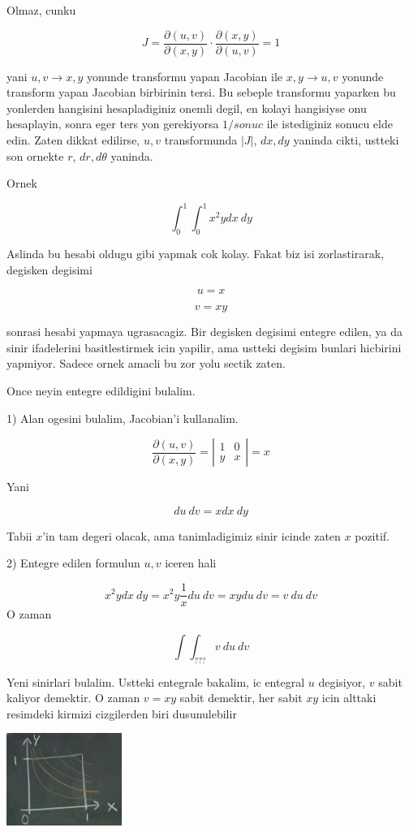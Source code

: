 \documentclass[12pt,fleqn]{article}
\begin{document}
Olmaz, cunku 

\[ J = \frac{\partial (u,v)}{\partial(x,y)} \cdot
\frac{\partial (x,y)}{\partial(u,v)} = 1
 \]

yani $u,v \to x,y$ yonunde transformu yapan Jacobian ile $x,y \to u,v$
yonunde transform yapan Jacobian birbirinin tersi. Bu sebeple transformu
yaparken bu yonlerden hangisini hesapladiginiz onemli degil, en kolayi
hangisiyse onu hesaplayin, sonra eger ters yon gerekiyorsa $1 / sonuc$ ile
istediginiz sonucu elde edin. Zaten dikkat edilirse, $u,v$ transformunda
$|J|$, $dx,dy$ yaninda cikti, ustteki son ornekte $r$, $dr,d\theta$
yaninda. 

Ornek

\[ \int_0^1 \int_0^1 x^2y dx \ dy  \]

Aslinda bu hesabi oldugu gibi yapmak cok kolay. Fakat biz isi
zorlastirarak, degisken degisimi

\[ u =x  \]

\[ v = xy \]

sonrasi hesabi yapmaya ugrasacagiz. Bir degisken degisimi entegre edilen,
ya da sinir ifadelerini basitlestirmek icin yapilir, ama ustteki degisim
bunlari hicbirini yapmiyor. Sadece ornek amacli bu zor yolu sectik zaten. 

Once neyin entegre edildigini bulalim. 

1) Alan ogesini bulalim, Jacobian'i kullanalim. 

\[ \frac{\partial (u,v)}{\partial(x,y)}  = 
\left|\begin{array}{rr}
1 & 0 \\
y & x
\end{array}\right| = 
x
 \]

Yani

\[ du \ dv = x dx \ dy \]

Tabii $x$'in tam degeri olacak, ama tanimladigimiz sinir icinde zaten $x$
pozitif. 

2) Entegre edilen formulun $u,v$ iceren hali 

\[ x^2y dx \ dy =  x^2y  \frac{1}{x} du \ dv = 
xy du \ dv = 
v \ du \ dv 
\]
O zaman 

\[ \int \int _{???} v \ du \ dv \]

Yeni sinirlari bulalim. Ustteki entegrale bakalim, ic entegral $u$
degisiyor, $v$ sabit kaliyor demektir. O zaman $v=xy$ sabit demektir, her
sabit $xy$ icin alttaki resimdeki kirmizi cizgilerden biri dusunulebilir

\includegraphics[height=3cm]{18_6.png}
\end{document}
